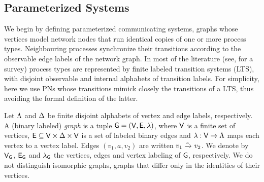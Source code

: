 

\subsection{Parameterized Systems}

We begin by defining parameterized communicating systems, \ie graphs
whose vertices model network nodes that run identical copies of one or
more process types.  Neighbouring processes synchronize their
transitions according to the observable edge labels of the network
graph. In most of the literature (see, \eg \cite{BloemBook} for a
survey) process types are represented by finite labeled transition
systems (LTS), \eg with disjoint observable and internal alphabets of
transition labels. For simplicity, here we use PNs whose transitions
mimick closely the transitions of a LTS, thus avoiding the formal
definition of the latter.

Let $\Lambda$ and $\Delta$ be finite disjoint alphabets of vertex and
edge labels, respectively. A (binary labeled) \emph{graph} is a tuple
$\mathsf{G}=(\mathsf{V},\mathsf{E},\lambda)$, where $\mathsf{V}$ is a finite set of
vertices, $\mathsf{E} \subseteq \mathsf{V}\times\Delta\times\mathsf{V}$ is a set
of labeled binary edges and $\lambda : \mathsf{V} \rightarrow \Lambda$ maps
each vertex to a vertex label. Edges $(v_1,a,v_2)$ are written $v_1
\xrightarrow{{\scriptscriptstyle a}}_{{\scriptscriptstyle }} v_2$. We denote by $\mathsf{V}_{\mathsf{G}}$, $\mathsf{E}_{\mathsf{G}}$
and $\lambda_{\mathsf{G}}$ the vertices, edges and vertex labeling of
$\mathsf{G}$, respectively. We do not distinguish isomorphic graphs,
\ie graphs that differ only in the identities of their vertices.

